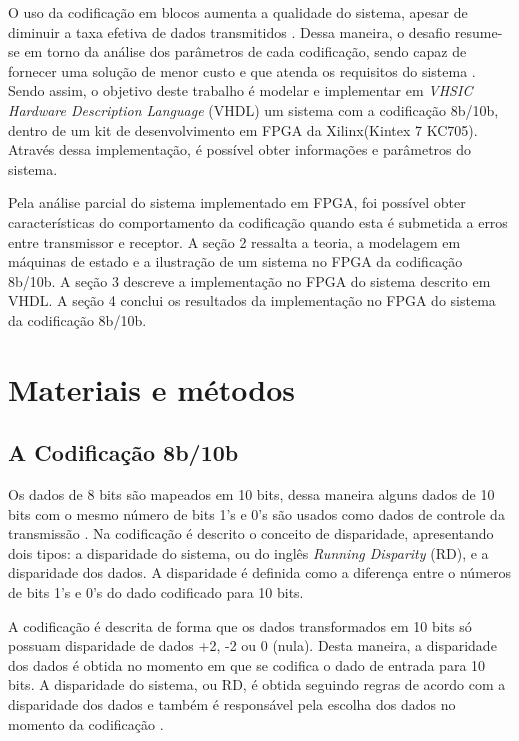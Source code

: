 \documentclass[11pt,twocolumn]{article}
\begin{document}
O uso da codificação em blocos aumenta a qualidade do sistema, apesar de diminuir a taxa efetiva de dados transmitidos \cite{Berlekamp}. Dessa maneira, o desafio resume-se em torno da análise dos parâmetros de cada codificação, sendo capaz de fornecer uma solução de menor custo e que atenda os requisitos do sistema \cite{Franaszek}. Sendo assim, o objetivo deste trabalho é modelar e implementar em \textit{VHSIC Hardware Description Language} (VHDL) um sistema com a codificação 8b/10b, dentro de um kit de desenvolvimento em FPGA da Xilinx(Kintex 7 KC705). Através dessa implementação, é possível obter informações e parâmetros do sistema.

Pela análise parcial do sistema implementado em FPGA, foi possível obter características do comportamento da codificação quando esta é submetida a erros entre transmissor e receptor. A seção 2 ressalta a teoria, a modelagem em máquinas de estado e a ilustração de um sistema no FPGA da codificação 8b/10b. A seção 3 descreve a implementação no FPGA do sistema descrito em VHDL. A seção 4 conclui os resultados da implementação no FPGA do sistema da codificação 8b/10b.

\section{Materiais e métodos}

\subsection{A Codificação 8b/10b}

Os dados de 8 bits são mapeados em 10 bits, dessa maneira alguns dados de 10 bits com o mesmo número de bits 1's e 0's são usados como dados de controle da transmissão \cite{Franaszek}. Na codificação é descrito o conceito de disparidade, apresentando dois tipos: a disparidade do sistema, ou do inglês \textit{Running Disparity} (RD), e a disparidade dos dados. A disparidade é definida como a diferença entre o números de bits 1's e 0's do dado codificado para 10 bits. 

A codificação é descrita de forma que os dados transformados em 10 bits só possuam disparidade de dados +2, -2 ou 0 (nula). Desta maneira, a disparidade dos dados é obtida no momento em que se codifica o dado de entrada para 10 bits. A disparidade do sistema, ou RD, é obtida seguindo regras de acordo com a disparidade dos dados e também é responsável pela escolha dos dados no momento da codificação \cite{Franaszek}.
\end{document}
